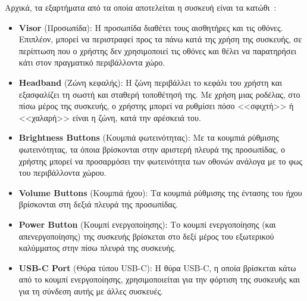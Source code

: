 Αρχικά, τα εξαρτήματα από τα οποία αποτελείται η συσκευή είναι τα κατώθι~\cite{scooley_2023_hololens}\cite{microsoft_hololens}:
\begin{itemize}
    \item \textbf{Visor} (Προσωπίδα): Η προσωπίδα διαθέτει τους αισθητήρες και τις οθόνες. Επιπλέον, μπορεί να περιστραφεί προς τα πάνω κατά της χρήση της συσκευής, σε περίπτωση που ο χρήστης δεν χρησιμοποιεί τις οθόνες και θέλει να παρατηρήσει κάτι στον πραγματικό περιβάλλοντα χώρο.
    \item \textbf{Headband} (Ζώνη κεφαλής): Η ζώνη περιβάλλει το κεφάλι του χρήστη και εξασφαλίζει τη σωστή και σταθερή τοποθέτησή της. Με χρήση μιας ροδέλας, στο πίσω μέρος της συσκευής, ο χρήστης μπορεί να ρυθμίσει πόσο <<σφιχτή>> ή <<χαλαρή>> είναι η ζώνη, κατά την αρέσκειά του.
    \item \textbf{Brightness Buttons} (Κουμπιά φωτεινότητας): Με τα κουμπιά ρύθμισης φωτεινότητας, τα όποια βρίσκονται στην αριστερή πλευρά της προσωπίδας, ο χρήστης μπορεί να προσαρμόσει την φωτεινότητα των οθονών ανάλογα με το φως του περιβάλλοντα χώρου.
    \item \textbf{Volume Buttons} (Κουμπιά ήχου): Τα κουμπιά ρύθμισης της έντασης του ήχου βρίσκονται στη δεξιά πλευρά της προσωπίδας.
    \item \textbf{Power Button} (Κουμπί ενεργοποίησης): Το κουμπί ενεργοποίησης (και απενεργοποίησης) της συσκευής βρίσκεται στο δεξί μέρος του εξωτερικού καλύμματος στην πίσω πλευρά της συσκευής.
    \item \textbf{USB-C Port} (Θύρα τύπου USB-C): Η θύρα USB-C, η οποία βρίσκεται κάτω από το κουμπί ενεργοποίησης, χρησιμοποιείται για την φόρτιση της συσκευής και για τη σύνδεση αυτής με άλλες συσκευές.
\end{itemize}

